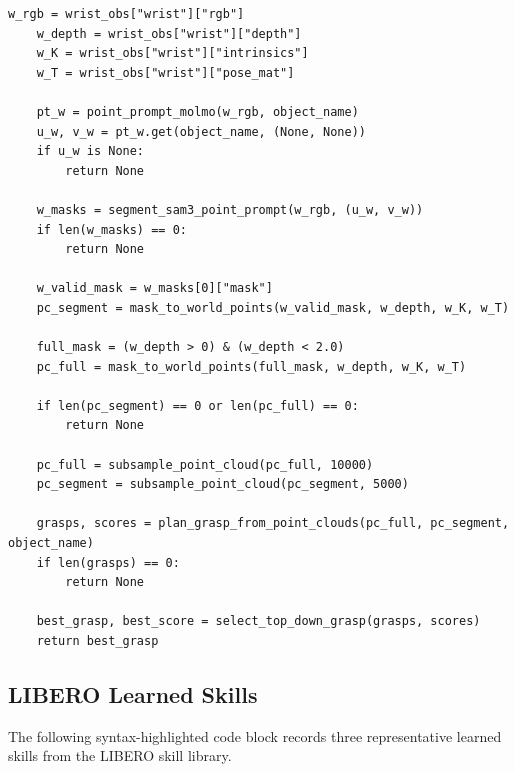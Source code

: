 \begin{lstlisting}[style=ratsappendixpython]
    w_rgb = wrist_obs["wrist"]["rgb"]
    w_depth = wrist_obs["wrist"]["depth"]
    w_K = wrist_obs["wrist"]["intrinsics"]
    w_T = wrist_obs["wrist"]["pose_mat"]

    pt_w = point_prompt_molmo(w_rgb, object_name)
    u_w, v_w = pt_w.get(object_name, (None, None))
    if u_w is None:
        return None

    w_masks = segment_sam3_point_prompt(w_rgb, (u_w, v_w))
    if len(w_masks) == 0:
        return None

    w_valid_mask = w_masks[0]["mask"]
    pc_segment = mask_to_world_points(w_valid_mask, w_depth, w_K, w_T)
    
    full_mask = (w_depth > 0) & (w_depth < 2.0)
    pc_full = mask_to_world_points(full_mask, w_depth, w_K, w_T)

    if len(pc_segment) == 0 or len(pc_full) == 0:
        return None

    pc_full = subsample_point_cloud(pc_full, 10000)
    pc_segment = subsample_point_cloud(pc_segment, 5000)

    grasps, scores = plan_grasp_from_point_clouds(pc_full, pc_segment, object_name)
    if len(grasps) == 0:
        return None

    best_grasp, best_score = select_top_down_grasp(grasps, scores)
    return best_grasp
\end{lstlisting}

\subsection{LIBERO Learned Skills}
\label{sec:appendix_libero_learned_helper_code}

The following syntax-highlighted code block records three representative learned
skills from the LIBERO skill library.

